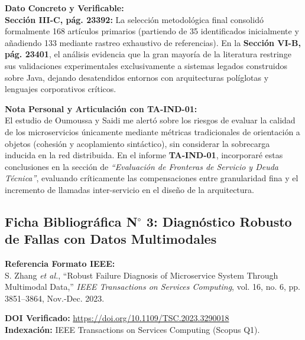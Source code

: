 \documentclass[11pt,a4paper]{article}
\begin{document}
\vspace{2mm}
\noindent\textbf{Dato Concreto y Verificable:}\\
\textbf{Sección III-C, pág. 23392:} La selección metodológica final consolidó formalmente 168 artículos primarios (partiendo de 35 identificados inicialmente y añadiendo 133 mediante rastreo exhaustivo de referencias). En la \textbf{Sección VI-B, pág. 23401}, el análisis evidencia que la gran mayoría de la literatura restringe sus validaciones experimentales exclusivamente a sistemas legados construidos sobre Java, dejando desatendidos entornos con arquitecturas políglotas y lenguajes corporativos críticos.

\vspace{2mm}
\noindent\textbf{Nota Personal y Articulación con TA-IND-01:}\\
El estudio de Oumoussa y Saidi me alertó sobre los riesgos de evaluar la calidad de los microservicios únicamente mediante métricas tradicionales de orientación a objetos (cohesión y acoplamiento sintáctico), sin considerar la sobrecarga inducida en la red distribuida. En el informe \textbf{TA-IND-01}, incorporaré estas conclusiones en la sección de \textit{``Evaluación de Fronteras de Servicio y Deuda Técnica''}, evaluando críticamente las compensaciones entre granularidad fina y el incremento de llamadas inter-servicio en el diseño de la arquitectura.

\vspace{4mm}
\newpage

\subsection*{Ficha Bibliográfica N$^\circ$ 3: Diagnóstico Robusto de Fallas con Datos Multimodales}

\noindent\textbf{Referencia Formato IEEE:}\\
\nocite{Zhang2023}\cite{Zhang2023} S. Zhang \textit{et al.}, ``Robust Failure Diagnosis of Microservice System Through Multimodal Data,'' \textit{IEEE Transactions on Services Computing}, vol. 16, no. 6, pp. 3851--3864, Nov.-Dec. 2023.

\vspace{1.5mm}
\noindent\textbf{DOI Verificado:} \url{https://doi.org/10.1109/TSC.2023.3290018}\\
\textbf{Indexación:} IEEE Transactions on Services Computing (Scopus Q1).
\end{document}
